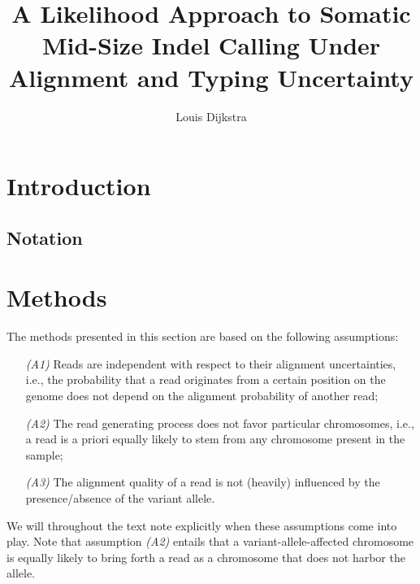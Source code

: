 \documentclass[a4paper,12pt]{article}
\title{A Likelihood Approach to Somatic Mid-Size Indel Calling Under Alignment and Typing Uncertainty}
\author{Louis Dijkstra}
\begin{document}
\maketitle


\section{Introduction} \label{sec:intro}




\subsection{Notation} \label{sec:notation}

\section{Methods} \label{sec:methods}
The methods presented in this section are based on the following assumptions: 
\begin{itemize}
 \item[\textit{(A1)}]{Reads are independent with respect to their alignment uncertainties, i.e., the probability that a read originates from a certain position on the genome does not depend on the alignment probability of another read;}
 \item[\textit{(A2)}]{The read generating process does not favor particular chromosomes, i.e., a read is a priori equally likely to stem from any chromosome present in the sample;}
 \item[\textit{(A3)}]{The alignment quality of a read is not (heavily) influenced by the presence/absence of the variant allele.}
\end{itemize}
We will throughout the text note explicitly when these assumptions come into play. Note that assumption \textit{(A2)} entails that a variant-allele-affected chromosome is equally likely to bring forth a read as a chromosome that does not harbor the allele. 
\end{document}
